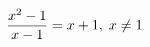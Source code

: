 \documentclass[preview]{standalone}
\begin{document}
\begin{align*}
\special{dvisvgm:raw <g id='unique000'>}\frac{x^2-1}{x-1}=x+1,\;x\neq 1\special{dvisvgm:raw </g>}
\end{align*}
\end{document}

